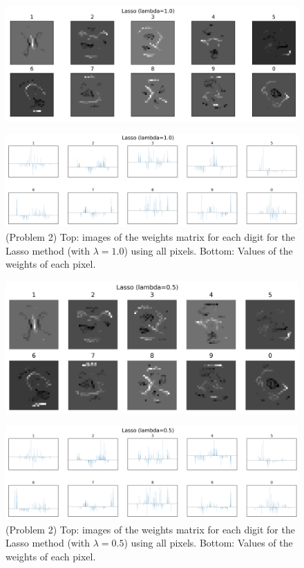 \documentclass[10pt]{article}
\begin{document}
\begin{figure}[ht]
\centerline{\includegraphics[scale=0.8]{figures/weight_matrix_lasso_1.png}}
\label{fig5a}
\end{figure}

\begin{figure}[ht]
\centerline{\includegraphics[scale=0.5]{figures/bar_plot_loadings_lasso_1.png}}
\caption{(Problem 2) Top: images of the weights matrix for each digit for the Lasso method (with $\lambda=1.0$) using all pixels. Bottom: Values of the weights of each pixel.}
\label{fig5b}
\end{figure}

\begin{figure}[ht]
\centerline{\includegraphics[scale=0.8]{figures/weight_matrix_lasso_05.png}}
\label{fig6a}
\end{figure}

\begin{figure}[ht]
\centerline{\includegraphics[scale=0.5]{figures/bar_plot_loadings_lasso_05.png}}
\caption{(Problem 2) Top: images of the weights matrix for each digit for the Lasso method (with $\lambda=0.5$) using all pixels. Bottom: Values of the weights of each pixel.}
\label{fig6b}
\end{figure}
\end{document}
